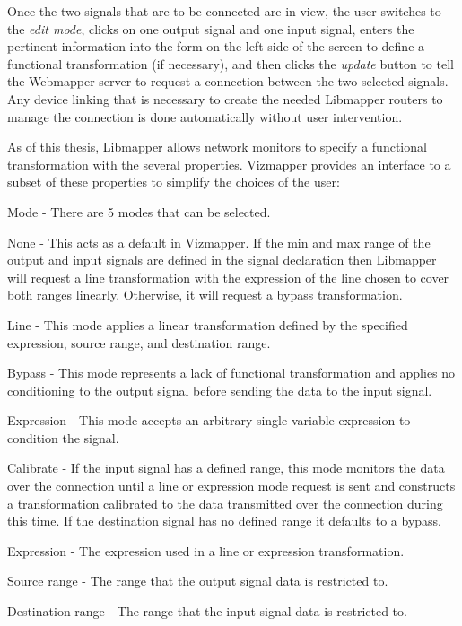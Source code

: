 Once the two signals that are to be connected are in view, the user switches to the \emph{edit mode}, clicks on one output signal and one input signal, enters the pertinent information into the form on the left side of the screen to define a functional transformation (if necessary), and then clicks the \emph{update} button to tell the Webmapper server to request a connection between the two selected signals. Any device linking that is necessary to create the needed Libmapper routers to manage the connection is done automatically without user intervention.

As of this thesis, Libmapper allows network monitors to specify a functional transformation with the several properties. Vizmapper provides an interface to a subset of these properties to simplify the choices of the user:

\begin{description}
\item{Mode} - There are 5 modes that can be selected.
\begin{description}
\item{None} - This acts as a default in Vizmapper. If the min and max range of the output and input signals are defined in the signal declaration then Libmapper will request a line transformation with the expression of the line chosen to cover both ranges linearly. Otherwise, it will request a bypass transformation.
\item{Line} - This mode applies a linear transformation defined by the specified expression, source range, and destination range.
\item{Bypass} - This mode represents a lack of functional transformation and applies no conditioning to the output signal before sending the data to the input signal.
\item{Expression} - This mode accepts an arbitrary single-variable expression to condition the signal.
\item{Calibrate} - If the input signal has a defined range, this mode monitors the data over the connection until a line or expression mode request is sent and constructs a transformation calibrated to the data transmitted over the connection during this time. If the destination signal has no defined range it defaults to a bypass.
\end{description}
\item{Expression} - The expression used in a line or expression transformation.
\item{Source range} - The range that the output signal data is restricted to.
\item{Destination range} - The range that the input signal data is restricted to.
\end{description}

